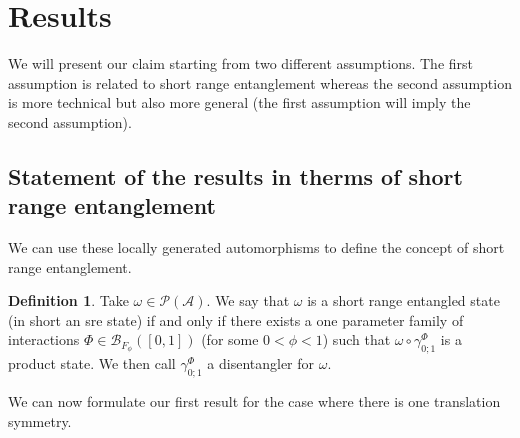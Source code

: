 \documentclass[12pt,a4paper,twoside]{article}
\newcommand{\BB}{\mathcal B}
\newcommand{\PP}{\mathcal P}
\renewcommand{\AA}{\mathcal A}
\theoremstyle{definition}
\newtheorem{definition}[theorem]{Definition}
\numberwithin{equation}{section}
\begin{document}
\section{Results}
We will present our claim starting from two different assumptions. The first assumption is related to short range entanglement whereas the second assumption is more technical but also more general (the first assumption will imply the second assumption).
\subsection{Statement of the results in therms of short range entanglement}\label{sec:Results_1}
We can use these locally generated automorphisms to define the concept of short range entanglement.
\begin{definition}
	Take $\omega\in\PP(\AA)$. We say that $\omega$ is a short range entangled state (in short an sre state) if and only if there exists a one parameter family of interactions $\Phi\in\BB_{F_\phi}([0,1])$ (for some $0<\phi<1$) such that $\omega\circ\gamma^{\Phi}_{0;1}$ is a product state. We then call $\gamma^{\Phi}_{0;1}$ a disentangler for $\omega$.
\end{definition}
We can now formulate our first result for the case where there is one translation symmetry.
\end{document}

